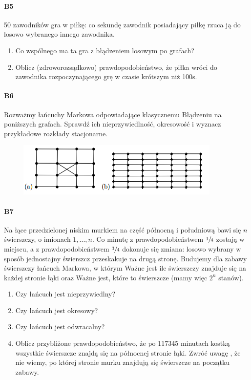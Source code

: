 \documentclass[a4paper,12pt]{article}
\theoremstyle{definition}%
\theoremstyle{definition}
\theoremstyle{problem}
\begin{document}
\paragraph{B5} 50 zawodników gra w piłkę: co sekundę zawodnik posiadający piłkę rzuca ją do losowo wybranego innego zawodnika.
\begin{enumerate}[label=\alph*)]
\item Co wspólnego ma ta gra z błądzeniem losowym po grafach?
\item Oblicz (zdroworozsądkowo) prawdopodobieństwo, że piłka wróci do zawodnika rozpoczynającego grę w czasie krótszym niż 100s.
\end{enumerate}

\paragraph{B6} Rozważmy łańcuchy Markowa odpowiadające klasycznemu Błądzeniu na poniższych grafach. Sprawdź ich nieprzywiedlność, okresowość i wyznacz przykładowe rozkłady stacjonarne.
\begin{figure}[H]
\centering
\includegraphics[width=.9\textwidth]{img/9_B6}
\end{figure}

\paragraph{B7} Na łące przedzielonej niskim murkiem na część północną i południową bawi się $n$ świerszczy, o imionach $1, . . . , n$. Co minutę z prawdopodobieństwem $\sfrac{1}{4}$ zostają w miejscu, a z prawdopodobieństwem $\sfrac{3}{4}$ dokonuje się zmiana: losowo wybrany w sposób jednostajny świerszcz przeskakuje na drugą stronę. Budujemy dla zabawy świerszczy łańcuch Markowa, w którym Ważne jest ile świerszczy znajduje się na każdej stronie łąki oraz Ważne jest, które to świerszcze (mamy więc $2^n$ stanów).
\begin{enumerate}[label=\alph*)]
\item Czy łańcuch jest nieprzywiedlny?
\item Czy łańcuch jest okresowy?
\item Czy łańcuch jest odwracalny?
\item Oblicz przybliżone prawdopodobieństwo, że po 117345 minutach kostką wszystkie świerszcze znajdą się na północnej stronie łąki. Zwróć uwagę , że nie wiemy, po której stronie murku znajdują się świerszcze na początku zabawy.
\end{enumerate}
\end{document}
